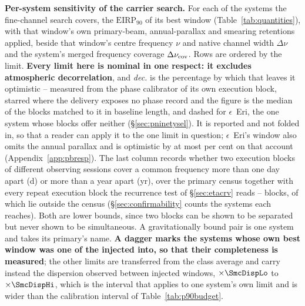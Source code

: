 \begin{table}
\centering
\caption{\textbf{Per-system sensitivity of the carrier search.} For each of
the \NSysClassA{} systems the fine-channel search covers, the
$\mathrm{EIRP}_{90}$ of its best window (Table~\ref{tab:quantities}), with
that window's own primary-beam, annual-parallax and smearing retentions
applied, beside that
window's centre frequency $\nu$ and native channel width $\Delta\nu$ and the
system's merged frequency coverage $\Delta\nu_{\rm cov}$. Rows are ordered by
the limit. \textbf{Every limit here is nominal in one respect: it excludes
atmospheric decorrelation}, and \emph{dec.} is the percentage by which that
leaves it optimistic -- measured from the phase calibrator of its own
execution block, starred where the delivery exposes no phase record and the
figure is the median of the blocks matched to it in baseline length, and
dashed for $\epsilon$~Eri, the one system whose blocks offer neither
(\S\ref{sec:pninetysel}). It is reported and not folded in, so that a reader
can apply it to the one limit in question; $\epsilon$~Eri's window also omits
the annual parallax and is optimistic by at most \BmEpsPxBoundPct{} per cent
on that account (Appendix~\ref{app:pbresp}).
The last column records whether two execution blocks of different
observing sessions cover a common frequency more than one day apart (d) or
more than a year apart (yr),
over the primary census together with every repeat execution block the
recurrence test of \S\ref{sec:etacrv} reads -- \ZcNRecEB{} blocks, of which
\ZcNRecEBOut{} lie outside the census (\S\ref{sec:confirmability} counts the
systems each reaches). Both are lower bounds, since two blocks can be shown to
be separated but never shown to be simultaneous. A gravitationally bound pair
is one system and takes its primary's name.
\textbf{A dagger marks the \SmcNMeasSys{} systems whose own best window was
one of the \SensNInj{} injected into, so that their completeness is
measured}; the other \SmcNEstSys{} limits are transferred from the class
average and carry instead the dispersion observed between injected windows,
$\times\SmcDispLo$ to $\times\SmcDispHi$, which is the interval that applies
to one system's own limit and is wider than the calibration interval of
Table~\ref{tab:p90budget}.}
\label{tab:persys}
\footnotesize

\end{table}
